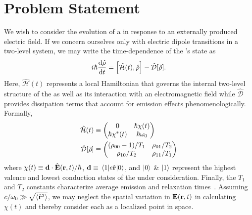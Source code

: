 \section{\label{section:problem statement}Problem Statement}
We wish to consider the evolution of a \qd{} in response to an externally produced electric field.
If we concern ourselves only with electric dipole transitions in a two-level system, we may write the time-dependence of the \qd's state as
\begin{equation}
  i \hbar \dv{\hat{\rho}}{t} = \commutator{\hat{\mathcal{H}}(t)}{\hat{\rho}} - \hat{\mathcal{D}}\qty[\hat{\rho}].
  \label{eq:liouville}
\end{equation}
Here, $\hat{\mathcal{H}}(t)$ represents a local Hamiltonian that governs the internal two-level structure of the \qd{} as well as its interaction with an electromagnetic field while $\hat{\mathcal{D}}$ provides dissipation terms that account for emission effects phenomenologically.
Formally,
\begin{subequations}
  \begin{align}
    \hat{\mathcal{H}}(t) &\equiv \mqty(0 & \hbar \chi(t) \\ \hbar \chi^*(t) & \hbar \omega_0) \label{eq:hamiltonian}\\
    \hat{\mathcal{D}}\qty[\hat{\rho}] &\equiv \mqty( \qty(\rho_{00} - 1)/{T_1} & \rho_{01}/{T_2} \\ \rho_{10}/{T_2} & \rho_{11}/T_1 ) \label{eq:dissipator}
  \end{align}
\end{subequations}
where $\chi(t) \equiv \vb{d} \cdot \hat{\vb{E}}(\vb{r}, t)/\hbar$, $\vb{d} \equiv \matrixel{1}{e \hat{\vb{r}}}{0}$, and $\ket{0}$ \& $\ket{1}$ represent the highest valence and lowest conduction states of the \qd{} under consideration.
Finally, the $T_1$ and $T_2$ constants characterize average emission and relaxation times~\cite{}.
Assuming $c/\omega_0 \gg \sqrt{\expval{\hat{\vb{r}}^2}}$, we may neglect the spatial variation in $\vb{E}(\vb{r}, t)$ in calculating $\chi(t)$ and thereby consider each \qd{} as a localized point in space.

